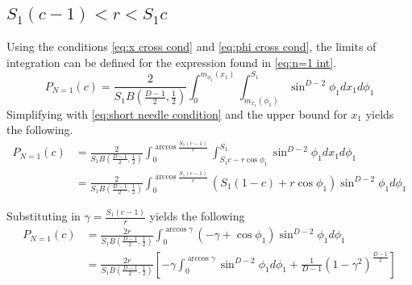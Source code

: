 \documentclass{article}
\begin{document}
\subsection{$S_1(c-1)<r<S_1c$} \label{s:short needle}
Using the conditions \ref{eq:x cross cond} and \ref{eq:phi cross cond}, the limits of integration can be defined for the expression found
in \ref{eq:n=1 int}.
\begin{equation}
	P_{N=1}(c) = \frac{2}{S_1B(\frac{D-1}{2}, \frac{1}{2})} \int_0^{m_{\phi_1}(x_1)}\int_{m_{x_1}(\phi_1)}^{S_1}\sin^{D-2}\phi_1 dx_1 d\phi_1 
\end{equation}
Simplifying with \ref{eq:short needle condition} and the upper bound for $x_1$ yields the following.
\begin{align}
	P_{N=1}(c) &= \frac{2}{S_1B(\frac{D-1}{2}, \frac{1}{2})} \int_0^{\arccos\frac{S_1(c-1)}{r}}\int_{S_1c-r\cos\phi_1}^{S_1}\sin^{D-2}\phi_1 dx_1 d\phi_1 \\
	&= \frac{2}{S_1B(\frac{D-1}{2}, \frac{1}{2})} \int_0^{\arccos\frac{S_1(c-1)}{r}} (S_1(1-c) + r\cos\phi_1)\sin^{D-2}\phi_1 d\phi_1
\end{align}

Substituting in $\gamma = \frac{S_1(c-1)}{r}$ yields the following
\begin{align}
	P_{N=1}(c) &= \frac{2r}{S_1B(\frac{D-1}{2}, \frac{1}{2})} \int_0^{\arccos\gamma} (-\gamma + \cos\phi_1)\sin^{D-2}\phi_1 d\phi_1 \\
	&= \frac{2r}{S_1B(\frac{D-1}{2}, \frac{1}{2})} \left[-\gamma\int_0^{\arccos\gamma} \sin^{D-2}\phi_1d\phi_1 + \frac{1}{D-1}(1-\gamma^2)^{\frac{D-1}{2}} \right] \label{eq:n=1 last int}
\end{align}
\end{document}

